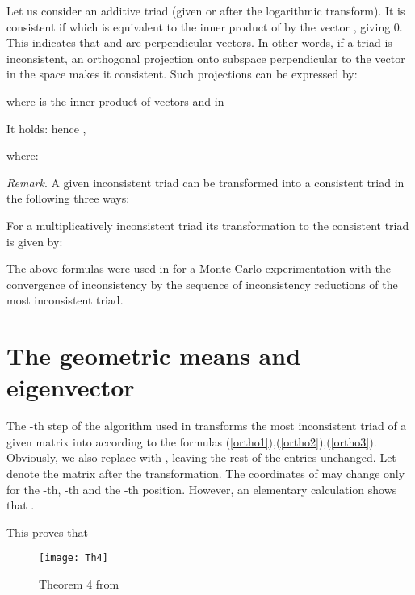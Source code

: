 \documentclass [12pt]{article}
\theoremstyle{definition}
\begin{document}
Let us consider an additive triad   (given or after the logarithmic transform). It is consistent if  which is equivalent to the inner product of   by the vector , giving 0. This indicates that  and  are perpendicular vectors. In other words, if a triad is inconsistent, an orthogonal projection onto subspace perpendicular to the vector   in the space  makes it consistent.
Such projections can be expressed by:
 
 where  is the inner product of vectors   and  in  \\

\begin{flushleft}
It holds:  hence , \\

\begin{flushleft}
where:
\end{flushleft}
\end{flushleft}


\begin{flushleft}
{\em Remark}. A given inconsistent triad  can be transformed into a consistent triad in the following three ways:
\end{flushleft}

For a multiplicatively inconsistent triad  its transformation to the consistent triad 
 is given by:


The above formulas were used in \cite{KKSX2015} for a Monte Carlo experimentation with the convergence of inconsistency by the sequence of inconsistency reductions of the most inconsistent triad.

\section{The geometric means and eigenvector}

The -th step of the algorithm used in \cite{HK1996} transforms the most inconsistent triad  of a given matrix  into  according to the formulas (\ref{ortho1}),(\ref{ortho2}),(\ref{ortho3}). Obviously, we also replace  with , leaving the rest of the entries unchanged. Let  denote the matrix after the transformation. The coordinates of  may change only for the -th, -th and the -th position. However, an elementary calculation shows that
.

This proves that 


\begin{figure}[h]
\centering
\texttt{[image: Th4]}
\caption[Theorem 4]{Theorem 4 from \cite{HK1996}}
\label{fig:Th4}
\end{figure}
\end{document}
